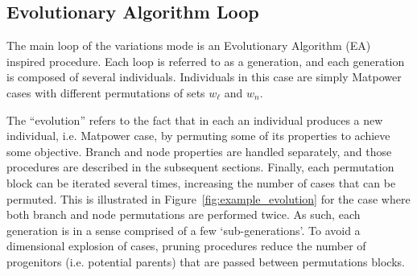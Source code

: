 \documentclass[12pt]{article}
\newcommand{\matpower}[0]{{\sc Matpower}}
\numberwithin{equation}{section}
\numberwithin{table}{section}
\numberwithin{figure}{section}
\begin{document}
\subsection{Evolutionary Algorithm Loop} \label{sec:vm_ea}
The main loop of the variations mode is an Evolutionary Algorithm (EA) inspired procedure.
Each loop is referred to as a generation, and each generation is composed of several individuals.
Individuals in this case are simply \matpower{} cases with different permutations of sets $w_{\ell}$ and $w_{n}$.

The ``evolution'' refers to the fact that in each an individual produces a new individual, i.e. \matpower{} case, by permuting some of its properties to achieve some objective.
Branch and node properties are handled separately, and those procedures are described in the subsequent sections.
Finally, each permutation block can be iterated several times, increasing the number of cases that can be permuted.
This is illustrated in Figure~\ref{fig:example_evolution} for the case where both branch and node permutations are performed twice.
As such, each generation is in a sense comprised of a few `sub-generations'.
To avoid a dimensional explosion of cases, pruning procedures reduce the number of progenitors (i.e. potential parents) that are passed between permutations blocks.
\end{document}
